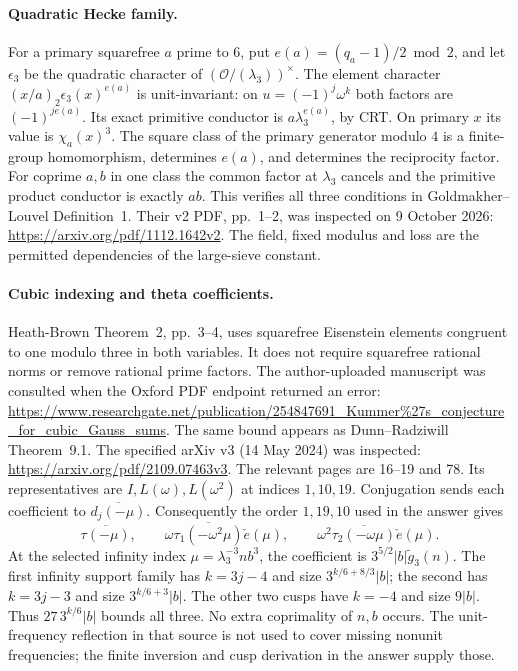 \documentclass[12pt]{article}
\begin{document}
\paragraph{Quadratic Hecke family.}
For a primary squarefree \(a\) prime to \(6\), put
\(e(a)=(q_a-1)/2\bmod2\), and let \(\epsilon_3\) be the quadratic
character of \((\mathcal O/(\lambda_3))^\times\).
The element character \((x/a)_2\epsilon_3(x)^{e(a)}\) is unit-invariant:
on \(u=(-1)^j\omega^k\) both factors are \((-1)^{je(a)}\).
Its exact primitive conductor is \(a\lambda_3^{e(a)}\), by CRT.
On primary \(x\) its value is \(\chi_a(x)^3\).
The square class of the primary generator modulo \(4\) is a finite-group
homomorphism, determines \(e(a)\), and determines the reciprocity factor.
For coprime \(a,b\) in one class the common factor at \(\lambda_3\)
cancels and the primitive product conductor is exactly \(ab\).
This verifies all three conditions in Goldmakher--Louvel Definition~1.
Their v2 PDF, pp.\ 1--2, was inspected on 9 October 2026:
\url{https://arxiv.org/pdf/1112.1642v2}.
The field, fixed modulus and loss are the permitted dependencies of the
large-sieve constant.

\paragraph{Cubic indexing and theta coefficients.}
Heath-Brown Theorem~2, pp.\ 3--4, uses squarefree Eisenstein elements
congruent to one modulo three in both variables.  It does not require
squarefree rational norms or remove rational prime factors.
The author-uploaded manuscript was consulted when the Oxford PDF
endpoint returned an error:
\url{https://www.researchgate.net/publication/254847691_Kummer%27s_conjecture_for_cubic_Gauss_sums}.
The same bound appears as Dunn--Radziwill Theorem~9.1.
The specified arXiv v3 (14 May 2024) was inspected:
\url{https://arxiv.org/pdf/2109.07463v3}.
The relevant pages are 16--19 and 78.  Its representatives are
\(I,L(\omega),L(\omega^2)\) at indices \(1,10,19\).
Conjugation sends each coefficient to \(\overline{d_j(-\mu)}\).
Consequently the order \(1,19,10\) used in the answer gives
\[
 \overline{\tau(-\mu)},\qquad
 \omega\overline{\tau_1(-\omega^2\mu)}\check e(\mu),\qquad
 \omega^2\overline{\tau_2(-\omega\mu)}\check e(\mu).
\]
At the selected infinity index \(\mu=\lambda_3^{-3}nb^3\), the
coefficient is \(3^{5/2}|b|\widetilde g_3(n)\).
The first infinity support family has \(k=3j-4\) and size
\(3^{k/6+8/3}|b|\); the second has \(k=3j-3\) and size
\(3^{k/6+3}|b|\).  The other two cusps have \(k=-4\) and size
\(9|b|\).  Thus \(27\,3^{k/6}|b|\) bounds all three.
No extra coprimality of \(n,b\) occurs.  The unit-frequency reflection
in that source is not used to cover missing nonunit frequencies;
the finite inversion and cusp derivation in the answer supply those.
\end{document}
